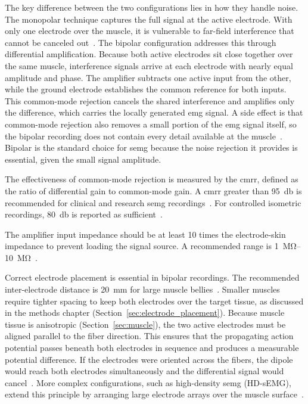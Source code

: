The key difference between the two configurations lies in how they handle noise. The monopolar technique captures the full signal at the active electrode. With only one electrode over the muscle, it is vulnerable to far-field interference that cannot be canceled out~\cite{beck_comparison_2007}. The bipolar configuration addresses this through differential amplification. Because both active electrodes sit close together over the same muscle, interference signals arrive at each electrode with nearly equal amplitude and phase. The amplifier subtracts one active input from the other, while the ground electrode establishes the common reference for both inputs. This common-mode rejection cancels the shared interference and amplifies only the difference, which carries the locally generated \gls{emg} signal. A side effect is that common-mode rejection also removes a small portion of the \gls{emg} signal itself, so the bipolar recording does not contain every detail available at the muscle~\cite{beck_comparison_2007}. Bipolar is the standard choice for \gls{semg} because the noise rejection it provides is essential, given the small signal amplitude.

The effectiveness of common-mode rejection is measured by the \gls{cmrr}, defined as the ratio of differential gain to common-mode gain. A \gls{cmrr} greater than \qty{95}{\decibel} is recommended for clinical and research \gls{semg} recordings~\cite{konrad_abc_2006}. For controlled isometric recordings, \qty{80}{\decibel} is reported as sufficient~\cite{kamen_essentials_2010}.

The amplifier input impedance should be at least 10 times the electrode-skin impedance to prevent loading the signal source. A recommended range is \SIrange{1}{10}{\mega\ohm}~\cite{konrad_abc_2006}.

Correct electrode placement is essential in bipolar recordings. The recommended inter-electrode distance is \qty{20}{\milli\meter} for large muscle bellies~\cite{konrad_abc_2006}. Smaller muscles require tighter spacing to keep both electrodes over the target tissue, as discussed in the methods chapter (Section~\ref{sec:electrode_placement}). Because muscle tissue is anisotropic (Section~\ref{sec:muscle}), the two active electrodes must be aligned parallel to the fiber direction. This ensures that the propagating action potential passes beneath both electrodes in sequence and produces a measurable potential difference. If the electrodes were oriented across the fibers, the dipole would reach both electrodes simultaneously and the differential signal would cancel~\cite{kamen_essentials_2010, konrad_abc_2006}. More complex configurations, such as high-density \gls{semg} (HD-sEMG), extend this principle by arranging large electrode arrays over the muscle surface~\cite{kamen_essentials_2010, cavalcanti_garcia_surface_2010}.

